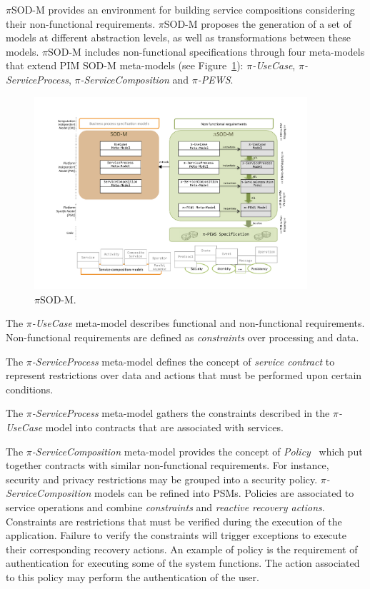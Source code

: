 $\pi$SOD-M provides an environment for building service compositions considering
their non-functional requirements. $\pi$SOD-M proposes the generation of a set of models at different abstraction levels, as well as transformations between these models.
$\pi$SOD-M includes non-functional specifications through
 four meta-models that extend PIM SOD-M meta-models (see Figure~\ref{fig:piSOD-M}): \textit{$\pi$-UseCase}, \textit{$\pi$-ServiceProcess}, \textit{$\pi$-ServiceCom\-po\-si\-tion} and \textit{$\pi$-PEWS}.


\begin{figure}[h]
\centering
\includegraphics[width=0.9\textwidth]{figs/piSOD-M.pdf}
\caption{$\pi$SOD-M.}
\label{fig:piSOD-M}
\end{figure}


The \textit{$\pi$-UseCase} meta-model describes functional and non-functional requirements.
Non-functional requirements are defined as \textit{constraints} over processing and data. 

The \textit{$\pi$-ServiceProcess} meta-model defines the concept of \textit{service contract} to represent restrictions over data and actions that must be performed upon certain conditions. 

The \textit{$\pi$-ServiceProcess} meta-model gathers the constraints
described in the \textit{$\pi$-UseCase} model into contracts that are associated
with services. 

The \textit{$\pi$-ServiceComposition} meta-model provides the concept of \textit{Policy}~\cite{Espinosa-Oviedo2011a}
which put together contracts with similar non-functional requirements. 
For instance, security and privacy restrictions may be grouped into a security policy.
\textit{$\pi$-ServiceComposition} models can be refined into PSMs. Policies are associated to service operations and combine \textit{constraints} and \textit{reactive recovery actions}.
Constraints are restrictions that must be verified during the execution of the application. 
Failure to verify the constraints will trigger exceptions to execute their corresponding recovery actions.
An example of policy is the requirement of authentication for executing some of the system functions. 
The action associated to this policy may perform the authentication of the user.

